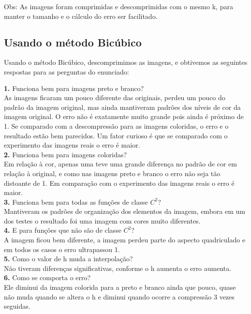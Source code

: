 \documentclass[12pt,letterpaper]{article}
\begin{document}
    Obs: As imagens foram comprimidas e descomprimidas com o mesmo k, para manter o tamanho e o cálculo do erro ser facilitado.

    \clearpage

    \subsection{Usando o método Bicúbico}

    Usando o método Bicúbico, descomprimimos as imagens, e obtivemos as seguintes respostas para as perguntas do enunciado:


    \textbf{1.} Funciona bem para imagens preto e branco?\\
    As imagens ficaram um pouco diferente das originais, perdeu um pouco do padrão da imagem original, mas ainda mantiveram padrões dos níveis de cor da imagem original. O erro não é exatamente muito grande pois ainda é próximo de 1. Se comparado com a descompressão para as imagens coloridas, o erro e o resultado estão bem parecidos. Um fator curioso é que se comparado com o experimento das imagens reais o erro é maior.\\

    \textbf{2.} Funciona bem para imagens coloridas?\\
    Em relação à cor, apenas uma teve uma grande diferença no padrão de cor em relação à original, e como nas imagens preto e branco o erro não seja tão distoante de 1. Em comparação com o experimento das imagens reais o erro é maior.\\

    \textbf{3.} Funciona bem para todas as funções de classe $C^2$?\\
    Mantiveram os padrões de organização dos elementos da imagem, embora em um dos testes o resultado foi uma imagem com cores muito diferentes.\\

    \textbf{4.} E para funções que não são de classe $C^2$? \\
    A imagem ficou bem diferente, a imagem perdeu parte do aspecto quadriculado e em todos os casos o erro ultrapassou 1.\\

    \textbf{5.} Como o valor de h muda a interpolação? \\
    Não tiveram diferenças significativas, conforme o h aumenta o erro aumenta.\\

    \textbf{6.} Como se comporta o erro?\\
    Ele diminui da imagem colorida para a preto e branco ainda que pouco, quase não muda quando se altera o h e diminui quando ocorre a compressão 3 vezes seguidas.\\
\end{document}
